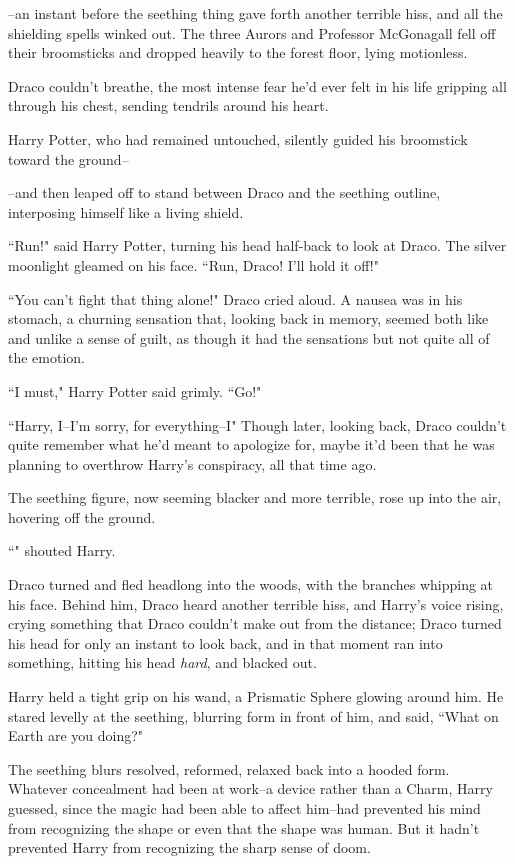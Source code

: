 \begin{em}
\---an instant before the seething thing gave forth another terrible hiss, and all the shielding spells winked out. The three Aurors and Professor McGonagall fell off their broomsticks and dropped heavily to the forest floor, lying motionless.

Draco couldn't breathe, the most intense fear he'd ever felt in his life gripping all through his chest, sending tendrils around his heart.

Harry Potter, who had remained untouched, silently guided his broomstick toward the ground\---

\---and then leaped off to stand between Draco and the seething outline, interposing himself like a living shield.

``Run!" said Harry Potter, turning his head half-back to look at Draco. The silver moonlight gleamed on his face. ``Run, Draco! I'll hold it off!"

``You can't fight that thing alone!" Draco cried aloud. A nausea was in his stomach, a churning sensation that, looking back in memory, seemed both like and unlike a sense of guilt, as though it had the sensations but not quite all of the emotion.

``I must," Harry Potter said grimly. ``Go!"

``Harry, I\---I'm sorry, for everything\---I" Though later, looking back, Draco couldn't quite remember what he'd meant to apologize for, maybe it'd been that he was planning to overthrow Harry's conspiracy, all that time ago.

The seething figure, now seeming blacker and more terrible, rose up into the air, hovering off the ground.

``" shouted Harry.

Draco turned and fled headlong into the woods, with the branches whipping at his face. Behind him, Draco heard another terrible hiss, and Harry's voice rising, crying something that Draco couldn't make out from the distance; Draco turned his head for only an instant to look back, and in that moment ran into something, hitting his head \emph{hard}, and blacked out.
\end{em}

\later

Harry held a tight grip on his wand, a Prismatic Sphere glowing around him. He stared levelly at the seething, blurring form in front of him, and said, ``What on Earth are you doing?"

The seething blurs resolved, reformed, relaxed back into a hooded form. Whatever concealment had been at work\---a device rather than a Charm, Harry guessed, since the magic had been able to affect him\---had prevented his mind from recognizing the shape or even that the shape was human. But it hadn't prevented Harry from recognizing the sharp sense of doom.

